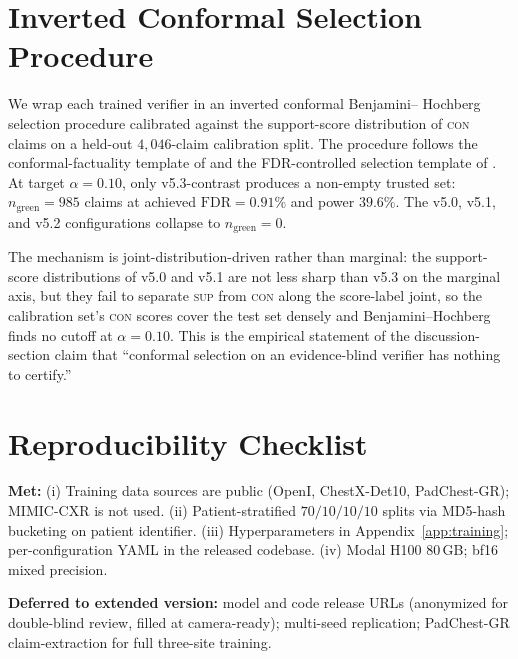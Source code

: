 \documentclass{article}
\begin{document}
\section{Inverted Conformal Selection Procedure}
\label{app:conformal}

We wrap each trained verifier in an inverted conformal Benjamini--
Hochberg selection procedure calibrated against the support-score
distribution of \textsc{con} claims on a held-out $4{,}046$-claim
calibration split. The procedure follows the conformal-factuality
template of \citet{mohri2024conformal} and the FDR-controlled selection
template of \citet{gui2024conformal}. At target $\alpha = 0.10$, only
v5.3-contrast produces a non-empty trusted set: $n_{\mathrm{green}} =
985$ claims at achieved $\mathrm{FDR} = 0.91\%$ and power $39.6\%$. The
v5.0, v5.1, and v5.2 configurations collapse to $n_{\mathrm{green}} =
0$.

The mechanism is joint-distribution-driven rather than marginal:
the support-score distributions of v5.0 and v5.1 are not less sharp
than v5.3 on the marginal axis, but they fail to separate \textsc{sup}
from \textsc{con} along the score-label joint, so the calibration set's
\textsc{con} scores cover the test set densely and Benjamini--Hochberg
finds no cutoff at $\alpha = 0.10$. This is the empirical statement of
the discussion-section claim that ``conformal selection on an
evidence-blind verifier has nothing to certify.''

\section{Reproducibility Checklist}
\label{app:repro}

\textbf{Met:} (i) Training data sources are public (OpenI, ChestX-Det10,
PadChest-GR); MIMIC-CXR is not used. (ii) Patient-stratified
$70/10/10/10$ splits via MD5-hash bucketing on patient identifier. (iii)
Hyperparameters in Appendix~\ref{app:training}; per-configuration YAML
in the released codebase. (iv) Modal H100 80\,GB; bf16 mixed precision.

\textbf{Deferred to extended version:} model and code release URLs
(anonymized for double-blind review, filled at camera-ready); multi-seed
replication; PadChest-GR claim-extraction for full three-site training.
\end{document}
